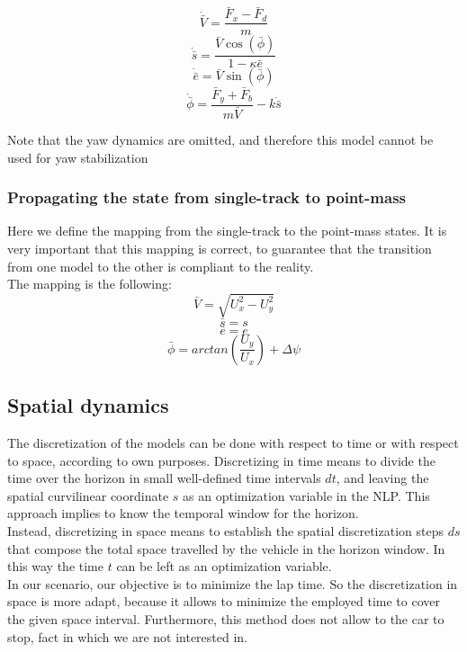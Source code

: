 \documentclass[a4paper, onecolumn, 12pt]{article}
\begin{document}
\begin{equation}
    \dot{\bar{V}} = \frac{\bar{F}_{x}-\bar{F}_{d}}{m}
\end{equation}
\begin{equation}
    \dot{\bar{s}} = \frac{\bar{V}\cos(\bar{\phi})}{1-\kappa \bar{e}}
\end{equation}
\begin{equation}
    \dot{\bar{e}} = \bar{V}\sin(\bar{\phi})
\end{equation}
\begin{equation}
    \dot{\bar{\phi}} = \frac{{\bar{F}}_y + {\bar{F}}_b}{m\bar{V}} - k\dot{\bar{s}}
\end{equation}

Note that the yaw dynamics are omitted, and therefore this model cannot be used for yaw stabilization

\subsubsection{Propagating the state from single-track to point-mass}
Here we define the mapping from the single-track to the point-mass states. 
It is very important that this mapping is correct, to guarantee that the transition
from one model to the other is compliant to the reality.\\
The mapping is the following:
\begin{equation}
    \bar{V} = \sqrt{U_{x}^{2}-U_{y}^{2}}
\end{equation}
\begin{equation}
    \bar{s} = s
\end{equation}
\begin{equation}
    \bar{e} = e
\end{equation}
\begin{equation}
    \bar{\phi} = arctan\left(\frac{{U}_y}{{U}_x}\right) + \Delta\psi
\end{equation}


\subsection{Spatial dynamics}
The discretization of the models can be done with respect to time or with respect to space, 
according to own purposes. 
Discretizing in time means to divide the time over the horizon in small well-defined time intervals $dt$, 
and leaving the spatial curvilinear coordinate $s$ as an optimization variable in the NLP. This approach
implies to know the temporal window for the horizon.\\ 
Instead, discretizing in space means to establish the spatial discretization steps $ds$ that compose the
total space travelled by the vehicle in the horizon window. In this way the time $t$ can be left as an 
optimization variable.\\
In our scenario, our objective is to minimize the lap time. So the discretization in space is more adapt,
because it allows to minimize the employed time to cover the given space interval. Furthermore, this method
does not allow to the car to stop, fact in which we are not interested in.
\end{document}
